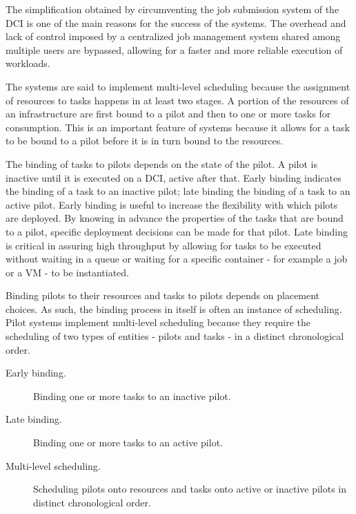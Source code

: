 \documentclass{sig-alternate}
\begin{document}
The simplification obtained by circumventing the job submission system of the
DCI is one of the main reasons for the success of the \pilotjob systems. The
overhead and lack of control imposed by a centralized job management system
shared among multiple users are bypassed, allowing for a faster and more
reliable execution of workloads.

The \pilotjob systems are said to implement multi-level scheduling because the
assignment of resources to tasks happens in at least two stages. A portion of
the resources of an infrastructure are first bound to a pilot and then to one
or more tasks for consumption. This is an important feature of \pilotjob
systems because it allows for a task to be bound to a pilot before it is in
turn bound to the resources.

The binding of tasks to pilots depends on the state of the pilot. A pilot is
inactive until it is executed on a DCI, active after that. Early binding
indicates the binding of a task to an inactive pilot; late binding the binding
of a task to an active pilot. Early binding is useful to increase the
flexibility with which pilots are deployed. By knowing in advance the
properties of the tasks that are bound to a pilot, specific deployment
decisions can be made for that pilot. Late binding is critical in assuring high
throughput by allowing for tasks to be executed without waiting in a queue or
waiting for a specific container - for example a job or a VM - to be
instantiated.

Binding pilots to their resources and tasks to pilots depends on placement 
choices. As such, the binding process in itself is often an instance of 
scheduling. Pilot systems implement multi-level scheduling because they require
the scheduling of two types of entities - pilots and tasks - in a distinct
chronological order.

\begin{description}

\item[Early binding.] Binding one or more tasks to an inactive pilot.

\item[Late binding.] Binding one or more tasks to an active pilot.

\item[Multi-level scheduling.] Scheduling pilots onto resources and tasks onto
active or inactive pilots in distinct chronological order.

\end{description}
\end{document}
